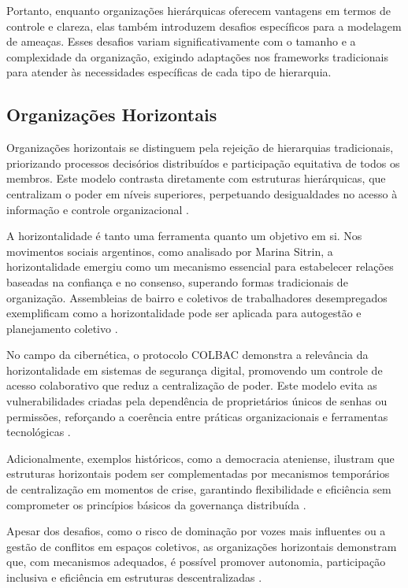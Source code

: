 Portanto, enquanto organizações hierárquicas oferecem vantagens em termos
de controle e clareza, elas também introduzem desafios específicos para a
modelagem de ameaças. Esses desafios variam significativamente com o
tamanho e a complexidade da organização, exigindo adaptações nos frameworks
tradicionais para atender às necessidades específicas de cada tipo de
hierarquia.

\subsection{Organizações Horizontais}
\label{sec:organizacoes_horizontais}

Organizações horizontais se distinguem pela rejeição de hierarquias
tradicionais, priorizando processos decisórios distribuídos e participação
equitativa de todos os membros. Este modelo contrasta diretamente com
estruturas hierárquicas, que centralizam o poder em níveis superiores,
perpetuando desigualdades no acesso à informação e controle organizacional
\cite{Non-HierarchicalForms, EstatutosDoPCP}.

A horizontalidade é tanto uma ferramenta quanto um objetivo em si. Nos
movimentos sociais argentinos, como analisado por Marina Sitrin, a
horizontalidade emergiu como um mecanismo essencial para estabelecer
relações baseadas na confiança e no consenso, superando formas tradicionais
de organização. Assembleias de bairro e coletivos de trabalhadores
desempregados exemplificam como a horizontalidade pode ser aplicada para
autogestão e planejamento coletivo \cite{EverydayRevolutions}.

No campo da cibernética, o protocolo COLBAC demonstra a relevância da
horizontalidade em sistemas de segurança digital, promovendo um controle de
acesso colaborativo que reduz a centralização de poder. Este modelo evita
as vulnerabilidades criadas pela dependência de proprietários únicos de
senhas ou permissões, reforçando a coerência entre práticas organizacionais
e ferramentas tecnológicas \cite{Colbac}.

Adicionalmente, exemplos históricos, como a democracia ateniense, ilustram
que estruturas horizontais podem ser complementadas por mecanismos
temporários de centralização em momentos de crise, garantindo flexibilidade
e eficiência sem comprometer os princípios básicos da governança
distribuída \cite{AthenianDemocracyABrief}.

Apesar dos desafios, como o risco de dominação por vozes mais influentes ou
a gestão de conflitos em espaços coletivos, as organizações horizontais
demonstram que, com mecanismos adequados, é possível promover autonomia,
participação inclusiva e eficiência em estruturas descentralizadas
\cite{SocialMediaTeamsAsDigitalVanguards}.

